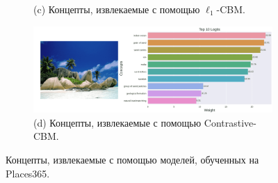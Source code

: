 \begin{figure}[h]
\begin{subfigure}
    \\
    (c) Концепты, извлекаемые с помощью $\ell_1$-CBM.
    \end{subfigure}
        \begin{subfigure}%
     \centering
  \includegraphics[width=0.75\linewidth]{./figures/contr_im_1-compressed.png}
    \\
    (d) Концепты, извлекаемые с помощью Contrastive-CBM.
    \end{subfigure}
    \caption{Концепты, извлекаемые с помощью моделей, обученных на Places365.}
    \label{fig:concepts_1}
\end{figure}

